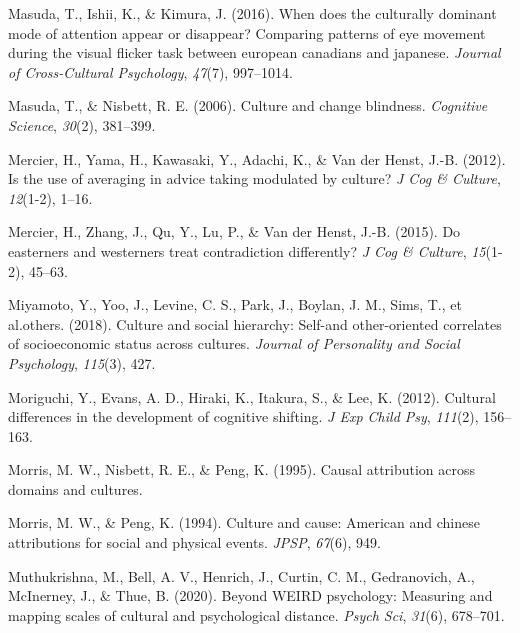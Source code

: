 \documentclass[
  man,floatsintext]{apa6}
\newlength{\cslhangindent}
\newlength{\cslentryspacingunit} %
\newenvironment{CSLReferences}[2] %
 {%
  \setlength{\parindent}{0pt}
  \ifodd #1
  \let\oldpar\par
  \def\par{\hangindent=\cslhangindent\oldpar}
  \fi
  \setlength{\parskip}{#2\cslentryspacingunit}
 }%
 {}
\begin{document}
\begin{CSLReferences}{1}{0}
\leavevmode{}%
Masuda, T., Ishii, K., \& Kimura, J. (2016). When does the culturally dominant mode of attention appear or disappear? Comparing patterns of eye movement during the visual flicker task between european canadians and japanese. \emph{Journal of Cross-Cultural Psychology}, \emph{47}(7), 997--1014.

\leavevmode{}%
Masuda, T., \& Nisbett, R. E. (2006). Culture and change blindness. \emph{Cognitive Science}, \emph{30}(2), 381--399.

\leavevmode{}%
Mercier, H., Yama, H., Kawasaki, Y., Adachi, K., \& Van der Henst, J.-B. (2012). Is the use of averaging in advice taking modulated by culture? \emph{J Cog \& Culture}, \emph{12}(1-2), 1--16.

\leavevmode{}%
Mercier, H., Zhang, J., Qu, Y., Lu, P., \& Van der Henst, J.-B. (2015). Do easterners and westerners treat contradiction differently? \emph{J Cog \& Culture}, \emph{15}(1-2), 45--63.

\leavevmode{}%
Miyamoto, Y., Yoo, J., Levine, C. S., Park, J., Boylan, J. M., Sims, T., et al.others. (2018). Culture and social hierarchy: Self-and other-oriented correlates of socioeconomic status across cultures. \emph{Journal of Personality and Social Psychology}, \emph{115}(3), 427.

\leavevmode{}%
Moriguchi, Y., Evans, A. D., Hiraki, K., Itakura, S., \& Lee, K. (2012). Cultural differences in the development of cognitive shifting. \emph{J Exp Child Psy}, \emph{111}(2), 156--163.

\leavevmode{}%
Morris, M. W., Nisbett, R. E., \& Peng, K. (1995). Causal attribution across domains and cultures.

\leavevmode{}%
Morris, M. W., \& Peng, K. (1994). Culture and cause: American and chinese attributions for social and physical events. \emph{JPSP}, \emph{67}(6), 949.

\leavevmode{}%
Muthukrishna, M., Bell, A. V., Henrich, J., Curtin, C. M., Gedranovich, A., McInerney, J., \& Thue, B. (2020). Beyond WEIRD psychology: Measuring and mapping scales of cultural and psychological distance. \emph{Psych Sci}, \emph{31}(6), 678--701.


\end{CSLReferences}
\end{document}
